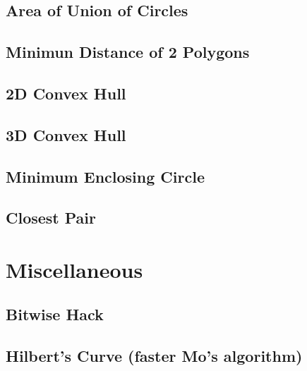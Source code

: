 \documentclass[a4paper,10pt,twocolumn,oneside]{article}
\begin{document}
\subsection{Area of Union of Circles}

% 
% 
\subsection{Minimun Distance of 2 Polygons}

\subsection{2D Convex Hull}

\subsection{3D Convex Hull}

% 
\subsection{Minimum Enclosing Circle}

\subsection{Closest Pair}

\section{Miscellaneous}
\subsection{Bitwise Hack}

\subsection{Hilbert's Curve (faster Mo's algorithm)}

\end{document}
